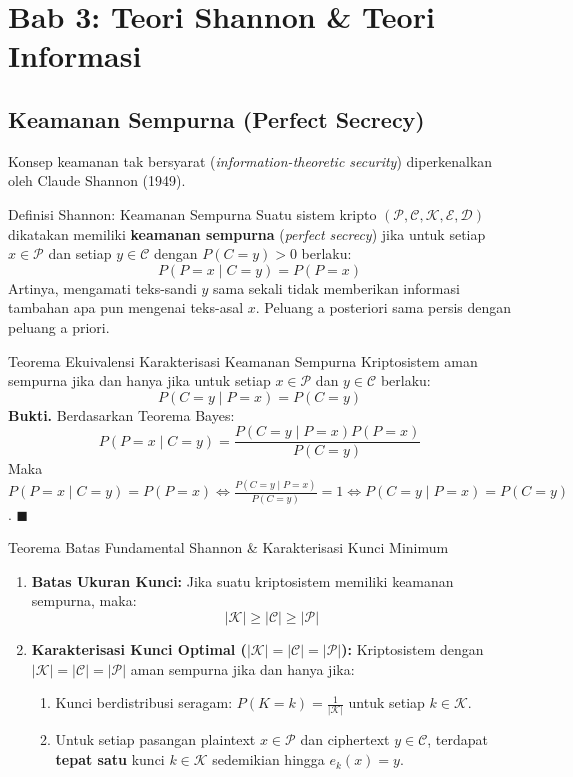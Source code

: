 \documentclass[11pt,a4paper]{article}
\newenvironment{proof}{\noindent\textbf{Bukti.}}{\hfill$\blacksquare$\vspace{0.3em}}
\begin{document}
\newpage
\section{Bab 3: Teori Shannon \& Teori Informasi}

\subsection{Keamanan Sempurna (Perfect Secrecy)}
Konsep keamanan tak bersyarat (\textit{information-theoretic security}) diperkenalkan oleh Claude Shannon (1949).
\begin{thmbox}{Definisi Shannon: Keamanan Sempurna}
Suatu sistem kripto $(\mathcal{P}, \mathcal{C}, \mathcal{K}, \mathcal{E}, \mathcal{D})$ dikatakan memiliki \textbf{keamanan sempurna} (\textit{perfect secrecy}) jika untuk setiap $x \in \mathcal{P}$ dan setiap $y \in \mathcal{C}$ dengan $P(C = y) > 0$ berlaku:
\[
P(P = x \mid C = y) = P(P = x)
\]
Artinya, mengamati teks-sandi $y$ sama sekali tidak memberikan informasi tambahan apa pun mengenai teks-asal $x$. Peluang a posteriori sama persis dengan peluang a priori.
\end{thmbox}

\begin{thmbox}{Teorema Ekuivalensi Karakterisasi Keamanan Sempurna}
Kriptosistem aman sempurna jika dan hanya jika untuk setiap $x \in \mathcal{P}$ dan $y \in \mathcal{C}$ berlaku:
\[
P(C = y \mid P = x) = P(C = y)
\]
\begin{proof}
Berdasarkan Teorema Bayes:
\[
P(P = x \mid C = y) = \frac{P(C = y \mid P = x) P(P = x)}{P(C = y)}
\]
Maka $P(P = x \mid C = y) = P(P = x) \iff \frac{P(C = y \mid P = x)}{P(C = y)} = 1 \iff P(C = y \mid P = x) = P(C = y)$.
\end{proof}
\end{thmbox}

\begin{thmbox}{Teorema Batas Fundamental Shannon \& Karakterisasi Kunci Minimum}
\begin{enumerate}[leftmargin=*]
    \item \textbf{Batas Ukuran Kunci:} Jika suatu kriptosistem memiliki keamanan sempurna, maka:
    \[
    |\mathcal{K}| \ge |\mathcal{C}| \ge |\mathcal{P}|
    \]
    \item \textbf{Karakterisasi Kunci Optimal ($|\mathcal{K}| = |\mathcal{C}| = |\mathcal{P}|$):} Kriptosistem dengan $|\mathcal{K}| = |\mathcal{C}| = |\mathcal{P}|$ aman sempurna jika dan hanya jika:
    \begin{enumerate}
        \item Kunci berdistribusi seragam: $P(K = k) = \frac{1}{|\mathcal{K}|}$ untuk setiap $k \in \mathcal{K}$.
        \item Untuk setiap pasangan plaintext $x \in \mathcal{P}$ dan ciphertext $y \in \mathcal{C}$, terdapat \textbf{tepat satu} kunci $k \in \mathcal{K}$ sedemikian hingga $e_k(x) = y$.
    \end{enumerate}
\end{enumerate}
\end{thmbox}
\end{document}
